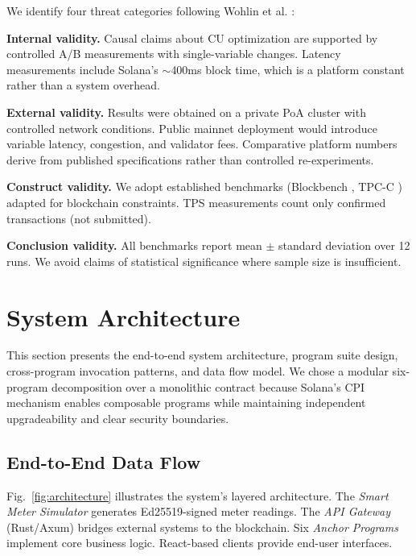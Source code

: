 \documentclass[conference]{IEEEtran}
\begin{document}
We identify four threat categories following Wohlin et al. \cite{wohlin2012}:

\textbf{Internal validity.} Causal claims about CU optimization are supported by controlled A/B measurements with single-variable changes. Latency measurements include Solana's $\sim$400ms block time, which is a platform constant rather than a system overhead.

\textbf{External validity.} Results were obtained on a private PoA cluster with controlled network conditions. Public mainnet deployment would introduce variable latency, congestion, and validator fees. Comparative platform numbers derive from published specifications rather than controlled re-experiments.

\textbf{Construct validity.} We adopt established benchmarks (Blockbench \cite{blockbench}, TPC-C \cite{tpc}) adapted for blockchain constraints. TPS measurements count only confirmed transactions (not submitted).

\textbf{Conclusion validity.} All benchmarks report mean $\pm$ standard deviation over 12 runs. We avoid claims of statistical significance where sample size is insufficient.

\section{System Architecture}
\label{sec:architecture}

This section presents the end-to-end system architecture, program suite design, cross-program invocation patterns, and data flow model. We chose a modular six-program decomposition over a monolithic contract because Solana's CPI mechanism enables composable programs while maintaining independent upgradeability and clear security boundaries.

\subsection{End-to-End Data Flow}

Fig.~\ref{fig:architecture} illustrates the system's layered architecture. The \textit{Smart Meter Simulator} generates Ed25519-signed meter readings. The \textit{API Gateway} (Rust/Axum) bridges external systems to the blockchain. Six \textit{Anchor Programs} implement core business logic. React-based clients provide end-user interfaces.
\end{document}
